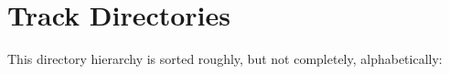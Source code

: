 \section{Track Directories}
This directory hierarchy is sorted roughly, but not completely, alphabetically:\begin{CompactList}
\item {}
\item {}
\end{CompactList}
